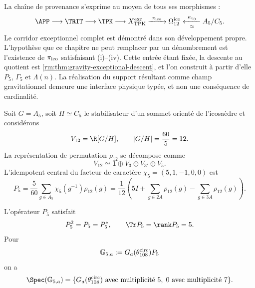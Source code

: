 La chaîne de provenance s’exprime au moyen de tous ses morphismes :
\begin{equation}
\label{rm:eq:gravity-exceptional-provenance}
\APP\longrightarrow\TRIT\longrightarrow\TPK
\longrightarrow X_{\rm TPK}^{\rm exc}
\xrightarrow{\ \pi_{\rm ico}\ }\Omega_{12}^{\rm ico}
\xleftarrow[\simeq]{\ \kappa_{v_0}\ }A_5/C_5.
\end{equation}
Le corridor exceptionnel complet est démontré dans son développement propre. L’hypothèse que ce chapitre ne peut remplacer par un dénombrement est l’existence de \(\pi_{\rm ico}\) satisfaisant (i)--(iv). Cette entrée étant fixée, la descente au quotient est \cref{rm:thm:gravity-exceptional-descent}, et l’on construit à partir d’elle \(P_5\), \(\Gamma_5\) et \(\Lambda(n)\). La réalisation du support résultant comme champ gravitationnel demeure une interface physique typée, et non une conséquence de cardinalité.

Soit \(G=A_5\), soit \(H\simeq C_5\) le stabilisateur d’un sommet
orienté de l’icosaèdre et considérons
\begin{equation}
\label{rm:eq:gravity-v12}
V_{12}=\R[G/H],
\qquad |G/H|=\frac{60}{5}=12.
\end{equation}
La représentation de permutation \(\rho_{12}\) se décompose comme
\begin{equation}
\label{rm:eq:gravity-v12-decomposition}
V_{12}\simeq\mathbf1\oplus V_3\oplus V_{3'}\oplus V_5.
\end{equation}
L’idempotent central du facteur de caractère
\(\chi_5=(5,1,-1,0,0)\) est
\begin{equation}
\label{rm:eq:gravity-p5}
\boxed{
P_5=\frac5{60}\sum_{g\in A_5}\chi_5(g^{-1})\rho_{12}(g)
=\frac1{12}\left(
5I+\sum_{g\in2A}\rho_{12}(g)
-\sum_{g\in3A}\rho_{12}(g)
\right).}
\end{equation}

\begin{theorem}
\label{rm:thm:gravity-p5-coupling}
L'opérateur \(P_5\) satisfait
\begin{equation}
\label{rm:eq:gravity-p5-properties}
P_5^2=P_5=P_5^*,
\qquad \Tr P_5=\rank P_5=5.
\end{equation}
Pour
\begin{equation}
\label{rm:eq:gravity-G5}
\mathbb G_{5,a}:=G_a(\theta_{108}^{\rm circ})P_5
\end{equation}
on a
\begin{equation}
\label{rm:eq:gravity-G5-spectrum}
\Spec(\mathbb G_{5,a})
=\{G_a(\theta_{108}^{\rm circ})\text{ avec multiplicité }5,
\;0\text{ avec multiplicité }7\}.
\end{equation}
\end{theorem}

